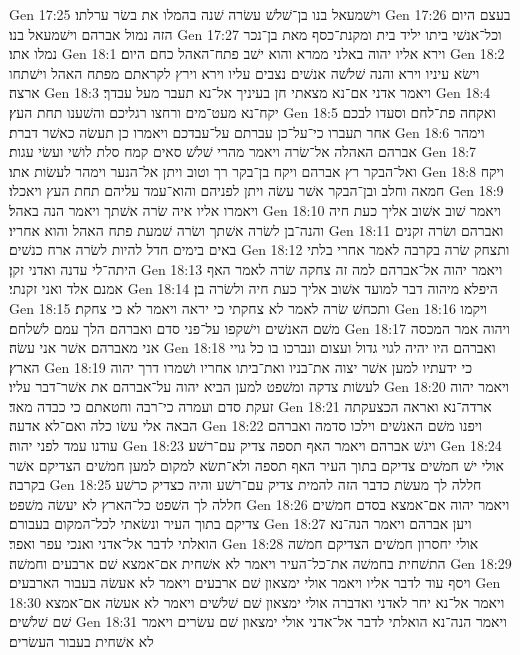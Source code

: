 Gen 17:25  וישׁמעאל בנו בן־שׁלשׁ עשׂרה שׁנה בהמלו את בשׂר ערלתו׃
Gen 17:26  בעצם היום הזה נמול אברהם וישׁמעאל בנו׃
Gen 17:27  וכל־אנשׁי ביתו יליד בית ומקנת־כסף מאת בן־נכר נמלו אתו׃
Gen 18:1  וירא אליו יהוה באלני ממרא והוא ישׁב פתח־האהל כחם היום׃
Gen 18:2  וישׂא עיניו וירא והנה שׁלשׁה אנשׁים נצבים עליו וירא וירץ לקראתם מפתח האהל וישׁתחו ארצה׃
Gen 18:3  ויאמר אדני אם־נא מצאתי חן בעיניך אל־נא תעבר מעל עבדך׃
Gen 18:4  יקח־נא מעט־מים ורחצו רגליכם והשׁענו תחת העץ׃
Gen 18:5  ואקחה פת־לחם וסעדו לבכם אחר תעברו כי־על־כן עברתם על־עבדכם ויאמרו כן תעשׂה כאשׁר דברת׃
Gen 18:6  וימהר אברהם האהלה אל־שׂרה ויאמר מהרי שׁלשׁ סאים קמח סלת לושׁי ועשׂי עגות׃
Gen 18:7  ואל־הבקר רץ אברהם ויקח בן־בקר רך וטוב ויתן אל־הנער וימהר לעשׂות אתו׃
Gen 18:8  ויקח חמאה וחלב ובן־הבקר אשׁר עשׂה ויתן לפניהם והוא־עמד עליהם תחת העץ ויאכלו׃
Gen 18:9  ויאמרו אליו איה שׂרה אשׁתך ויאמר הנה באהל׃
Gen 18:10  ויאמר שׁוב אשׁוב אליך כעת חיה והנה־בן לשׂרה אשׁתך ושׂרה שׁמעת פתח האהל והוא אחריו׃
Gen 18:11  ואברהם ושׂרה זקנים באים בימים חדל להיות לשׂרה ארח כנשׁים׃
Gen 18:12  ותצחק שׂרה בקרבה לאמר אחרי בלתי היתה־לי עדנה ואדני זקן׃
Gen 18:13  ויאמר יהוה אל־אברהם למה זה צחקה שׂרה לאמר האף אמנם אלד ואני זקנתי׃
Gen 18:14  היפלא מיהוה דבר למועד אשׁוב אליך כעת חיה ולשׂרה בן׃
Gen 18:15  ותכחשׁ שׂרה לאמר לא צחקתי כי יראה ויאמר לא כי צחקת׃
Gen 18:16  ויקמו משׁם האנשׁים וישׁקפו על־פני סדם ואברהם הלך עמם לשׁלחם׃
Gen 18:17  ויהוה אמר המכסה אני מאברהם אשׁר אני עשׂה׃
Gen 18:18  ואברהם היו יהיה לגוי גדול ועצום ונברכו בו כל גויי הארץ׃
Gen 18:19  כי ידעתיו למען אשׁר יצוה את־בניו ואת־ביתו אחריו ושׁמרו דרך יהוה לעשׂות צדקה ומשׁפט למען הביא יהוה על־אברהם את אשׁר־דבר עליו׃
Gen 18:20  ויאמר יהוה זעקת סדם ועמרה כי־רבה וחטאתם כי כבדה מאד׃
Gen 18:21  ארדה־נא ואראה הכצעקתה הבאה אלי עשׂו כלה ואם־לא אדעה׃
Gen 18:22  ויפנו משׁם האנשׁים וילכו סדמה ואברהם עודנו עמד לפני יהוה׃
Gen 18:23  ויגשׁ אברהם ויאמר האף תספה צדיק עם־רשׁע׃
Gen 18:24  אולי ישׁ חמשׁים צדיקם בתוך העיר האף תספה ולא־תשׂא למקום למען חמשׁים הצדיקם אשׁר בקרבה׃
Gen 18:25  חללה לך מעשׂת כדבר הזה להמית צדיק עם־רשׁע והיה כצדיק כרשׁע חללה לך השׁפט כל־הארץ לא יעשׂה משׁפט׃
Gen 18:26  ויאמר יהוה אם־אמצא בסדם חמשׁים צדיקם בתוך העיר ונשׂאתי לכל־המקום בעבורם׃
Gen 18:27  ויען אברהם ויאמר הנה־נא הואלתי לדבר אל־אדני ואנכי עפר ואפר׃
Gen 18:28  אולי יחסרון חמשׁים הצדיקם חמשׁה התשׁחית בחמשׁה את־כל־העיר ויאמר לא אשׁחית אם־אמצא שׁם ארבעים וחמשׁה׃
Gen 18:29  ויסף עוד לדבר אליו ויאמר אולי ימצאון שׁם ארבעים ויאמר לא אעשׂה בעבור הארבעים׃
Gen 18:30  ויאמר אל־נא יחר לאדני ואדברה אולי ימצאון שׁם שׁלשׁים ויאמר לא אעשׂה אם־אמצא שׁם שׁלשׁים׃
Gen 18:31  ויאמר הנה־נא הואלתי לדבר אל־אדני אולי ימצאון שׁם עשׂרים ויאמר לא אשׁחית בעבור העשׂרים׃
